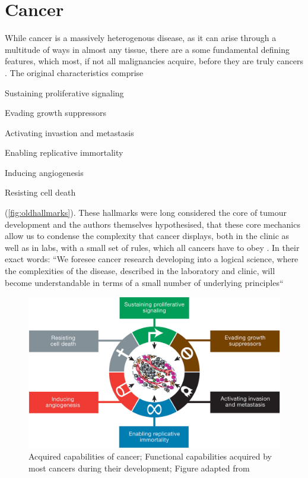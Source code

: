 \section{Cancer}
\label{intro-sec:cancer}

While cancer is a massively heterogenous disease, as it can arise through a multitude of ways in almost any tissue, there are a some fundamental defining features, which most, if not all malignancies acquire, before they are truly cancers . The original characteristics comprise 
\begin{enumerate*}
	\item Sustaining proliferative signaling
	\item Evading growth suppressors
	\item Activating invastion and metastasis
	\item Enabling replicative immortality
	\item Inducing angiogenesis
	\item Resisting cell death
\end{enumerate*} (\autoref{fig:oldhallmarks}). 
These hallmarks were long considered the core of tumour development and the authors themselves hypothesised, that these core mechanics allow us to condense the complexity that cancer displays, both in the clinic as well as in labs, with a small set of rules, which all cancers have to obey \cite{Hanahan2000}. In their exact words: ``We foresee cancer research developing into a logical science, where the complexities of the disease, described in the laboratory and clinic, will become understandable in terms of a small number of underlying principles``

\begin{figure}[!ht]
\centering
\includegraphics[width=.95\linewidth]{Figures/oldHallmarksCancer.jpg}
\caption[Original hallmarks of cancer]{Acquired capabilities of cancer; Functional capabilities acquired by most cancers during their development; Figure adapted from \protect\citeauthor*{Hanahan2000}\protect\cite{Hanahan2000}}\label{fig:oldhallmarks}
\end{figure}

